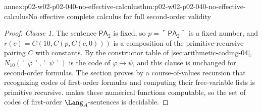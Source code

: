 \begin{annexitem}{annex:p02-w02-p02-040-no-effective-calculus}{thm:p02-w02-p02-040-no-effective-calculus}{No effective complete calculus for full second-order validity}
\begin{proof}
\emph{Clause 1.}  The sentence \(\mathsf{PA}_2\) is fixed, so
\(p=\ulcorner\mathsf{PA}_2\urcorner\) is a fixed number, and
\(r(c)=C(10,C(p,C(c,0)))\) is a composition of the primitive-recursive
pairing \(C\) with constants.  By the constructor table of
\cref{sec:arithmetic-coding-04}, \(N_{10}(\ulcorner\varphi\urcorner,\ulcorner\psi\urcorner)\)
is the code of \(\varphi\to\psi\), and this clause is unchanged for
second-order formulas.  The section proves by a course-of-values
recursion that recognizing codes of first-order formulas and computing
their free-variable lists is primitive recursive.
 makes these numerical
functions computable, so the set of codes of first-order
\(\Lang_A\)-sentences is decidable.


\end{proof}
\end{annexitem}

